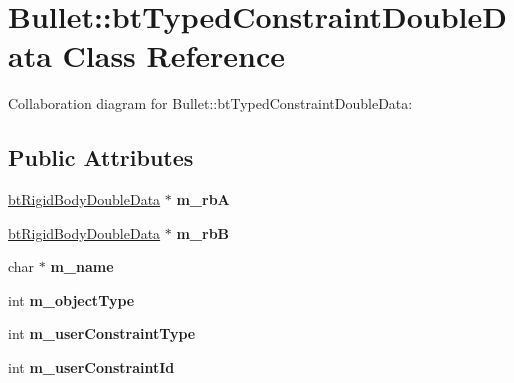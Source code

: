 \hypertarget{class_bullet_1_1bt_typed_constraint_double_data}{\section{Bullet\+:\+:bt\+Typed\+Constraint\+Double\+Data Class Reference}
\label{class_bullet_1_1bt_typed_constraint_double_data}
}


Collaboration diagram for Bullet\+:\+:bt\+Typed\+Constraint\+Double\+Data\+:
\subsection*{Public Attributes}
\begin{DoxyCompactItemize}
\item 
\hypertarget{class_bullet_1_1bt_typed_constraint_double_data_a73ae185161965330964cb5f144749df9}{\hyperlink{class_bullet_1_1bt_rigid_body_double_data}{bt\+Rigid\+Body\+Double\+Data} $\ast$ {\bfseries m\+\_\+rb\+A}}\label{class_bullet_1_1bt_typed_constraint_double_data_a73ae185161965330964cb5f144749df9}

\item 
\hypertarget{class_bullet_1_1bt_typed_constraint_double_data_a7ae9fa8e3faf085ab11ca27b19f6b405}{\hyperlink{class_bullet_1_1bt_rigid_body_double_data}{bt\+Rigid\+Body\+Double\+Data} $\ast$ {\bfseries m\+\_\+rb\+B}}\label{class_bullet_1_1bt_typed_constraint_double_data_a7ae9fa8e3faf085ab11ca27b19f6b405}

\item 
\hypertarget{class_bullet_1_1bt_typed_constraint_double_data_a09e97e538ff1ddda7210ef359aac486a}{char $\ast$ {\bfseries m\+\_\+name}}\label{class_bullet_1_1bt_typed_constraint_double_data_a09e97e538ff1ddda7210ef359aac486a}

\item 
\hypertarget{class_bullet_1_1bt_typed_constraint_double_data_a7ee5595bbeccdc862d89c33d05d382d3}{int {\bfseries m\+\_\+object\+Type}}\label{class_bullet_1_1bt_typed_constraint_double_data_a7ee5595bbeccdc862d89c33d05d382d3}

\item 
\hypertarget{class_bullet_1_1bt_typed_constraint_double_data_abb3c46d7e564bc844efd869463d67633}{int {\bfseries m\+\_\+user\+Constraint\+Type}}\label{class_bullet_1_1bt_typed_constraint_double_data_abb3c46d7e564bc844efd869463d67633}

\item 
\hypertarget{class_bullet_1_1bt_typed_constraint_double_data_a23e5db96e8a5451d87d984be481c3fdb}{int {\bfseries m\+\_\+user\+Constraint\+Id}}\label{class_bullet_1_1bt_typed_constraint_double_data_a23e5db96e8a5451d87d984be481c3fdb}


\end{DoxyCompactItemize}
